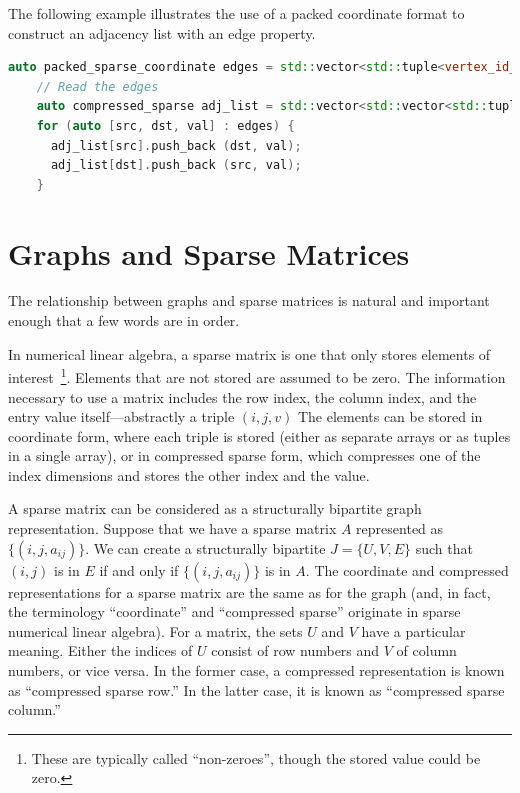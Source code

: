 The following example illustrates the use of a packed coordinate format to construct an adjacency list with an edge property.
\begin{lstlisting}[language=C++]
    auto packed_sparse_coordinate edges = std::vector<std::tuple<vertex_id_t, vertex_id_t, double>>;
    // Read the edges
    auto compressed_sparse adj_list = std::vector<std::vector<std::tuple<vertex_id_t, double>>>(edges.num_vertices();
    for (auto [src, dst, val] : edges) {
      adj_list[src].push_back (dst, val);
      adj_list[dst].push_back (src, val);
    }
 \end{lstlisting}


\section{Graphs and Sparse Matrices}

The relationship between graphs and sparse matrices is natural and important enough that a few words are in order.

In numerical linear algebra, a sparse matrix is one that only stores elements of interest~\footnote{These are typically called ``non-zeroes'', though the stored value could be zero.}.  Elements that are not stored are assumed to be zero.  The information necessary to use a matrix includes the row index, the column index, and the entry value itself---abstractly a triple $(i, j, v)$
The elements can be stored in coordinate form, where each triple is stored (either as separate arrays or as tuples in a single array), or in compressed sparse form, which compresses one of the index dimensions and stores the other index and the value.

A sparse matrix can be considered as a structurally bipartite graph representation.  Suppose that we have a sparse matrix $A$ represented as $\{(i, j, a_{ij})\}$.  We can create a structurally bipartite  $J = \{U, V, E\}$ such that $(i,j)$ is in $E$ if and only if $\{(i, j, a_{ij})\}$ is in $A$.  The coordinate and compressed representations for a sparse matrix are the same as for the graph (and, in fact, the terminology ``coordinate'' and ``compressed sparse'' originate in sparse numerical linear algebra).  For a matrix, the sets $U$ and $V$ have a particular meaning.  Either the indices of $U$ consist of row numbers and $V$ of column numbers, or vice versa.  In the former case, a compressed representation is known as ``compressed sparse row.''  In the latter case, it is known as ``compressed sparse column.''

